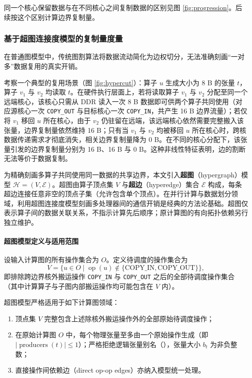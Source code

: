 \documentclass[anonymous,withtoc]{gmcm2026}
\providecommand{\tightlist}{\setlength{\itemsep}{0pt}\setlength{\parskip}{0pt}}
\begin{document}
同一个核心保留数据与在不同核心之间复制数据的区别见图 \ref{fig:progression}。后续按这个区别计算边界复制量。

\subsubsection{基于超图连接度模型的复制量度量}

在普通图模型中，传统图割算法将数据流动简化为边权切分，无法准确刻画``一对多''数据复用的真实开销。

考察一个典型的复用场景（图 \ref{fig:hypercut}）：算子 \(u\) 生成大小为 8 B 的张量 \(t\)，算子 \(v_1\) 与 \(v_2\) 均读取 \(t\)。在硬件执行层面上，若将读取算子 \(v_1\) 与 \(v_2\) 分配至同一个远端核心，该核心只需从 DDR 读入一次 8 B 数据即可供两个算子共同使用（对应源核心一次 \texttt{COPY\_OUT} 与目标核心一次 \texttt{COPY\_IN}，共产生 16 B 边界流量）；若仅将 \(v_1\) 移回 \(u\) 所在核心，由于 \(v_2\) 仍驻留在远端，该远端核心依然需要完整搬入该张量，边界复制量依然维持 16 B；只有当 \(v_1\) 与 \(v_2\) 均被移回 \(u\) 所在核心时，跨核数据传递需求才彻底消失，相关边界复制量降为 0 B。在不同的核心分配下，该张量引发的边界复制量分别为 16 B、16 B 与 0 B。这种非线性特征表明，边的割断无法等价于数据复制。

为精确刻画多算子共同使用同一数据的共享边界，本文引入\textbf{超图}（hypergraph）模型 \(\mathcal{H} = (V, \mathcal{E})\)。超图由算子顶点集 \(V\) 与\textbf{超边}（hyperedge）集合 \(\mathcal{E}\) 构成，每条超边连接任意非空的顶点子集（允许包含单个顶点）\cite{ref5}。在并行计算与数据划分领域，利用超图连接度模型刻画多处理器间的通信开销是经典的方法论基础\cite{ref3}。超图仅表示算子间的数据关联关系，不指示计算先后顺序；原计算图的有向拓扑依赖另行独立维护。

\paragraph{超图模型定义与适用范围}

设输入计算图的所有操作集合为 \(O\)。定义待调度的操作集合为 \begin{equation}
V = \{u \in O \mid \operatorname{op}(u) \notin \{\text{COPY\_IN}, \text{COPY\_OUT}\}\},
\end{equation} 即排除跨边界核外搬运操作 \texttt{COPY\_IN} 与 \texttt{COPY\_OUT} 之后的全部待调度操作集合（其中计算算子与子图内部搬运操作均可能包含在 \(V\) 内）。

超图模型严格适用于如下计算图领域：

\begin{enumerate}
\def\labelenumi{\arabic{enumi}.}
\tightlist
\item
  顶点集 \(V\) 完整包含上述除核外搬运操作外的全部原始待调度操作；
\item
  在原始计算图 \(O\) 中，每个物理张量至多由一个原始操作生成（即 \(|\operatorname{producers}(t)| \le 1\)）；严格拒绝逻辑张量别名（\texttt{}），张量大小 \(b_t\) 为非负整数；
\item
  直接操作间依赖边（direct op-op edges）亦纳入模型统一处理。
\end{enumerate}
\end{document}

